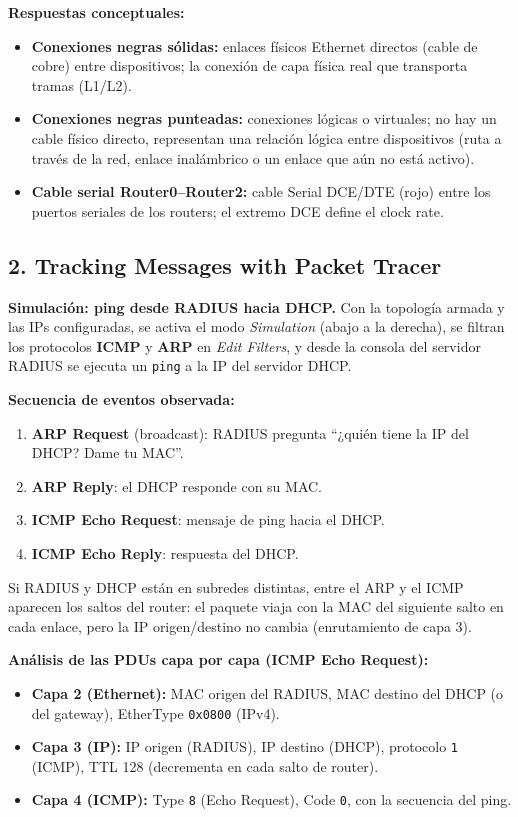 \textbf{Respuestas conceptuales:}
\begin{itemize}
  \item \textbf{Conexiones negras sólidas:} enlaces físicos Ethernet directos (cable de cobre) entre dispositivos; la conexión de capa física real que transporta tramas (L1/L2).
  \item \textbf{Conexiones negras punteadas:} conexiones lógicas o virtuales; no hay un cable físico directo, representan una relación lógica entre dispositivos (ruta a través de la red, enlace inalámbrico o un enlace que aún no está activo).
  \item \textbf{Cable serial Router0--Router2:} cable Serial DCE/DTE (rojo) entre los puertos seriales de los routers; el extremo DCE define el clock rate.
\end{itemize}

\subsection{2. Tracking Messages with Packet Tracer}

\textbf{Simulación: ping desde RADIUS hacia DHCP.} Con la topología armada y las IPs configuradas, se activa el modo \emph{Simulation} (abajo a la derecha), se filtran los protocolos \textbf{ICMP} y \textbf{ARP} en \emph{Edit Filters}, y desde la consola del servidor RADIUS se ejecuta un \texttt{ping} a la IP del servidor DHCP.

\textbf{Secuencia de eventos observada:}
\begin{enumerate}
  \item \textbf{ARP Request} (broadcast): RADIUS pregunta ``¿quién tiene la IP del DHCP? Dame tu MAC''.
  \item \textbf{ARP Reply}: el DHCP responde con su MAC.
  \item \textbf{ICMP Echo Request}: mensaje de ping hacia el DHCP.
  \item \textbf{ICMP Echo Reply}: respuesta del DHCP.
\end{enumerate}

Si RADIUS y DHCP están en subredes distintas, entre el ARP y el ICMP aparecen los saltos del router: el paquete viaja con la MAC del siguiente salto en cada enlace, pero la IP origen/destino no cambia (enrutamiento de capa 3).

\textbf{Análisis de las PDUs capa por capa (ICMP Echo Request):}
\begin{itemize}
  \item \textbf{Capa 2 (Ethernet):} MAC origen del RADIUS, MAC destino del DHCP (o del gateway), EtherType \texttt{0x0800} (IPv4).
  \item \textbf{Capa 3 (IP):} IP origen (RADIUS), IP destino (DHCP), protocolo \texttt{1} (ICMP), TTL 128 (decrementa en cada salto de router).
  \item \textbf{Capa 4 (ICMP):} Type \texttt{8} (Echo Request), Code \texttt{0}, con la secuencia del ping.
\end{itemize}

